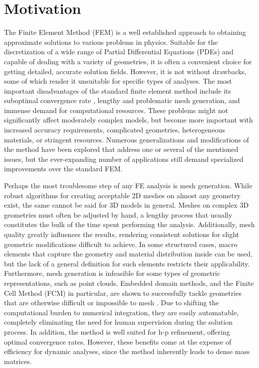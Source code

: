 %
\section{Motivation}
\label{section:motivation}
%

The Finite Element Method (FEM) is a well established approach to obtaining approximate solutions to various problems in physics. Suitable for the discretization of a wide range of Partial Differential Equations (PDEs) and capable of dealing with a variety of geometries, it is often a convenient choice for getting detailed, accurate solution fields. However, it is not without drawbacks, some of which render it unsuitable for specific types of analyses. The most important disadvantages of the standard finite element method include its suboptimal convergence rate \cite{Babuska94}, lengthy and problematic mesh generation, and immense demand for computational resources.
These problems might not significantly affect moderately complex models, but become more important with increased accuracy requirements, complicated geometries, heterogeneous materials, or stringent resources. Numerous generalizations and modifications of the method have been explored that address one or several of the mentioned issues, but the ever-expanding number of applications still demand specialized improvements over the standard FEM.

Perhaps the most troublesome step of any FE analysis is mesh generation. While robust algorithms for creating acceptable 2D meshes on almost any geometry exist, the same cannot be said for 3D models in general. Meshes on complex 3D geometries must often be adjusted by hand, a lengthy process that usually constitutes the bulk of the time spent performing the analysis. Additionally, mesh quality greatly influences the results, rendering consistent solutions for slight geometric modifications difficult to achieve. In some structured cases, macro elements that capture the geometry and material distribution inside can be used, but the lack of a general definition for such elements restricts their applicability. Furthermore, mesh generation is infeasible for some types of geometric representations, such as point clouds.
Embedded domain methods, and the Finite Cell Method (FCM) in particular, are shown to successfully tackle geometries that are otherwise difficult or impossible to mesh \cite{Duester2007}. Due to shifting the computational burden to numerical integration, they are easily automatable, completely eliminating the need for human supervision during the solution process. In addition, the method is well suited for h-p refinement, offering optimal convergence rates. However, these benefits come at the expense of efficiency for dynamic analyses, since the method inherently leads to dense mass matrices.

